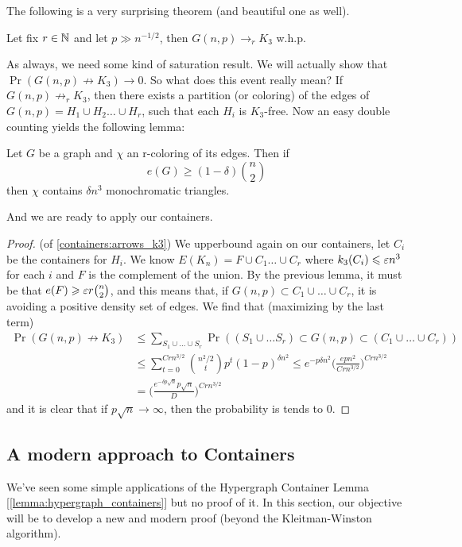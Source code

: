The following is a very surprising theorem (and beautiful one as well).
\begin{theorem}
	\label{containers:arrows_k3}
	Let fix $r \in \mathbb{N}$ and let $p \gg n^{-1/2}$, then $G(n,p) \to_r K_3$ w.h.p.
\end{theorem}
As always, we need some kind of saturation result. We will actually
show that $\Pr(G(n,p) \not \to K_3) \to 0$. So what does this event really mean?
If $G(n,p) \not \to_r K_3$, then there exists a partition (or
coloring) of the edges of $G(n,p) = H_1 \cup H_2 \dots \cup H_r$,
such that each $H_i$ is $K_3$-free.
Now an easy double counting yields the following lemma:
\begin{lemma}
	Let $G$ be a graph and $\chi$ an r-coloring of its edges. Then if
	\[
		e(G) \geq (1-\delta)\binom{n}{2}
	\]
	then $\chi$ contains $\delta n^3$ monochromatic triangles.
\end{lemma}
And we are ready to apply our containers.
\begin{proof}
	(of \ref{containers:arrows_k3}) We upperbound again on our
	containers, let $C_i$ be the containers for $H_i$. We know $E(K_n) =
	F \cup C_1 \dots \cup C_r$
	where $k_3(C_i) \leqslant \varepsilon n^3$ for each $i$ and $F$ is the
	complement of the union.
	By the previous lemma, it must be that $e(F) \geqslant \varepsilon r
	\binom{n}{2}$, and this means that, if $G(n,p) \subset C_1 \cup
	\dots \cup C_r$,
	it is avoiding a positive density set of edges. We find that
	(maximizing by the last term)
	\begin{align*}	
		\Pr(G(n,p) \not \to K_3) &\leq \sum_{S_1 \cup \dots \cup S_r}
		\Pr((S_1 \cup \dots S_r) \subset G(n,p) \subset (C_1 \cup \dots \cup C_r))\\
		&\leq \sum_{t = 0}^{Crn^{3/2}} \binom{n^2/2}{t}p^t(1-p)^{\delta
		n^2} \leq e^{-p\delta n^2}\bigg(\frac{epn^2}{Crn^{3/2}}\bigg)^{Crn^{3/2}}\\
		&= \bigg(\frac{e^{-\delta p\sqrt{n}}p\sqrt{n}}{D}\bigg)^{Crn^{3/2}}
	\end{align*}
	and it is clear that if $p\sqrt{n} \to \infty$, then the probability
	is tends to 0.
\end{proof}

\subsection{A modern approach to Containers}

We've seen some simple applications of the Hypergraph Container Lemma
[\ref{lemma:hypergraph_containers}] but no proof of it. In this section,
our objective will be to develop a new and modern proof (beyond the
Kleitman-Winston algorithm).

